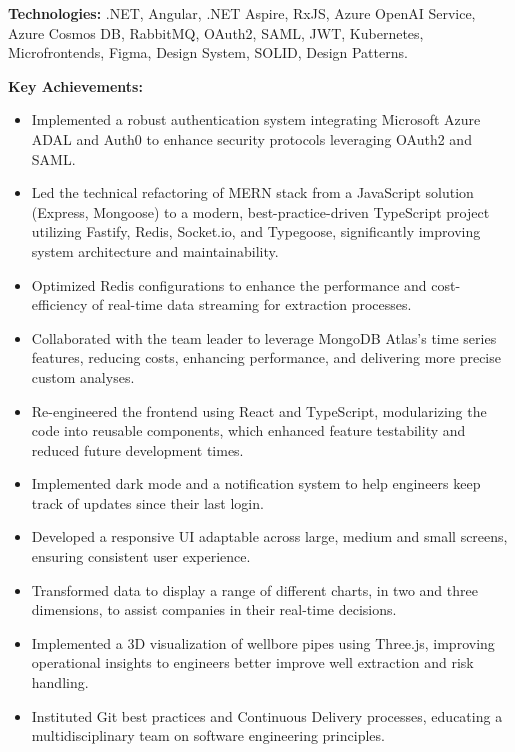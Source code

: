 \documentclass[10pt,a4paper]{altacv}
\begin{document}
\textbf{Technologies:} .NET, Angular, .NET Aspire, RxJS, Azure OpenAI Service, Azure Cosmos DB, RabbitMQ, OAuth2, SAML, JWT, Kubernetes, Microfrontends, Figma, Design System, SOLID, Design Patterns.


\textbf{Key Achievements:}
\begin{itemize}
\setlength{\itemindent}{0.5em}
\item[--] Implemented a robust authentication system integrating Microsoft Azure ADAL and Auth0 to enhance security protocols leveraging OAuth2 and SAML.
\item[--] Led the technical refactoring of MERN stack from a JavaScript solution (Express, Mongoose) to a modern, best-practice-driven TypeScript project utilizing Fastify, Redis, Socket.io, and Typegoose, significantly improving system architecture and maintainability.
\item[--]  Optimized Redis configurations to enhance the performance and cost-efficiency of real-time data streaming for extraction processes.

\break
\newpage
{}

\item[--]  Collaborated with the team leader to leverage MongoDB Atlas’s time series features, reducing costs, enhancing performance, and delivering more precise custom analyses.
\item[--] Re-engineered the frontend using React and TypeScript, modularizing the code into reusable components, which enhanced feature testability and reduced future development times.
\item[--]  Implemented dark mode and a notification system to help engineers keep track of updates since their last login.
\item[--] Developed a responsive UI adaptable across large, medium and small screens, ensuring consistent user experience.
\item[--] Transformed data to display a range of different charts, in two and three dimensions, to assist companies in their real-time decisions. 
\item[--] Implemented a 3D visualization of wellbore pipes using Three.js, improving operational insights to engineers better improve well extraction and risk handling.  
\item[--] Instituted Git best practices and Continuous Delivery processes, educating a multidisciplinary team on software engineering principles.
\end{itemize}
\end{document}
